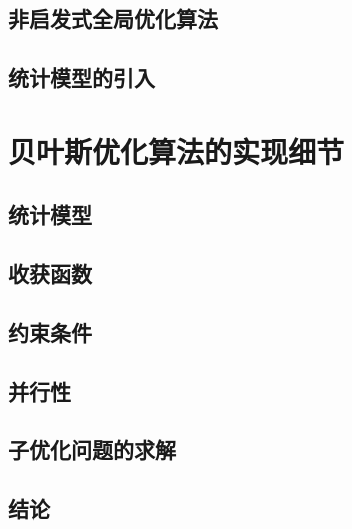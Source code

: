 \documentclass[index]{subfiles}
\begin{document}
\subsection{非启发式全局优化算法}
\subsection{统计模型的引入}
\section{贝叶斯优化算法的实现细节}
\subsection{统计模型}
\subsection{收获函数}
\subsection{约束条件}
\subsection{并行性}
\subsection{子优化问题的求解}
\subsection{结论}
\end{document}
